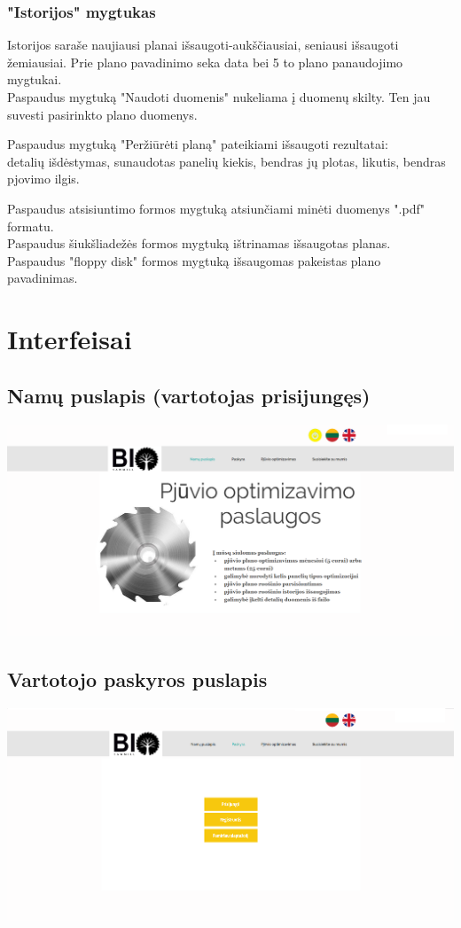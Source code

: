 \documentclass[a4paper,12pt]{article}
\begin{document}
\subsubsection{"Istorijos" mygtukas}
Istorijos saraše naujiausi planai išsaugoti-aukščiausiai, seniausi išsaugoti žemiausiai.
Prie plano pavadinimo seka data bei 5 to plano panaudojimo mygtukai.\\
Paspaudus mygtuką "Naudoti duomenis" nukeliama į duomenų skilty.
Ten jau suvesti pasirinkto plano duomenys.

Paspaudus mygtuką "Peržiūrėti planą" pateikiami išsaugoti rezultatai:\\
detalių išdėstymas, sunaudotas panelių kiekis, bendras jų plotas, likutis, bendras pjovimo ilgis.

Paspaudus atsisiuntimo formos mygtuką atsiunčiami minėti duomenys ".pdf" formatu.\\
Paspaudus šiukšliadežės formos mygtuką ištrinamas išsaugotas planas.\\
Paspaudus "floppy disk" formos mygtuką išsaugomas pakeistas plano pavadinimas.


\section{Interfeisai}
\subsection{Namų puslapis (vartotojas prisijungęs)}
\hspace{-2cm}
\includegraphics[scale=0.5]{interfeisai/pagrindinis}

\subsection{Vartotojo paskyros puslapis}
\hspace{-2cm}
\includegraphics[scale=0.5]{interfeisai/paskyrosPuslapisNeprisijungta}
\end{document}
